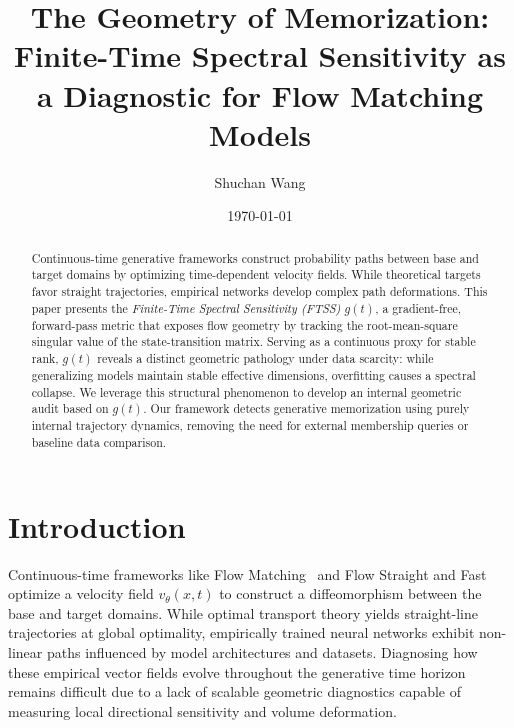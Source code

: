 \documentclass[11pt]{article}
\title{
The Geometry of Memorization: Finite-Time Spectral Sensitivity as a Diagnostic for Flow Matching Models
}
\author{Shuchan Wang}
\date{\today}
\begin{document}
\maketitle

\begin{abstract}
Continuous-time generative frameworks construct probability paths between base and target domains by optimizing time-dependent velocity fields. While theoretical targets favor straight trajectories, empirical networks develop complex path deformations. This paper presents the \emph{Finite-Time Spectral Sensitivity (FTSS)} $g(t)$, a gradient-free, forward-pass metric that exposes flow geometry by tracking the root-mean-square singular value of the state-transition matrix. Serving as a continuous proxy for stable rank, $g(t)$ reveals a distinct geometric pathology under data scarcity: while generalizing models maintain stable effective dimensions, overfitting causes a spectral collapse. We leverage this structural phenomenon to develop an internal geometric audit based on $g(t)$. Our framework detects generative memorization using purely internal trajectory dynamics, removing the need for external membership queries or baseline data comparison.
\end{abstract}

\section{Introduction}
\label{sec:intro}

Continuous-time frameworks like Flow Matching~\cite{lipmanflow} and Flow Straight and Fast~\cite{liuflow} optimize a velocity field $v_\theta(x,t)$ to construct a diffeomorphism between the base and target domains. While optimal transport theory yields straight-line trajectories at global optimality, empirically trained neural networks exhibit non-linear paths influenced by model architectures and datasets. Diagnosing how these empirical vector fields evolve throughout the generative time horizon remains difficult due to a lack of scalable geometric diagnostics capable of measuring local directional sensitivity and volume deformation.
\end{document}
